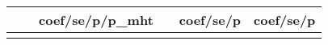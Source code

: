 \begin{longtable}{llcccccccccc}
& & \multicolumn{3}{c}{coef/se/p/p_{mht}} & & \multicolumn{3}{c}{coef/se/p} & \multicolumn{3}{c}{coef/se/p} \\ \hline                                                                                                                                                                                                                                                                                                                                                                                                                                                                                                                                                                                                                                                                                                                                                                                             
\endhead                                                                                                                                                                                                                                                                                                                                                                                                                                                                                                                                                                                                                                                                                                                                                                                                                                                                                                          
\\                                                                                                                                                                                                                                                                                                                                                                                                                                                                                                                                                                                                                                                                                                                                                                                                                                                                                                                

\end{longtable}
